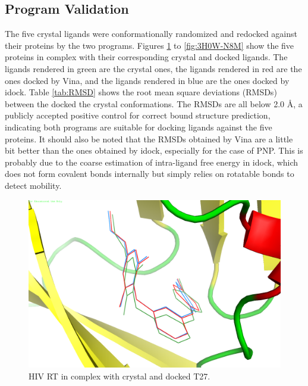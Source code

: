 \subsection{Program Validation}

The five crystal ligands were conformationally randomized and redocked against their proteins by the two programs. Figures \ref{fig:2ZD1-T27} to \ref{fig:3H0W-N8M} show the five proteins in complex with their corresponding crystal and docked ligands. The ligands rendered in green are the crystal ones, the ligands rendered in red are the ones docked by Vina, and the ligands rendered in blue are the ones docked by idock. Table \ref{tab:RMSD} shows the root mean square deviations (RMSDs) between the docked the crystal conformations. The RMSDs are all below 2.0 \AA, a publicly accepted positive control for correct bound structure prediction, indicating both programs are suitable for docking ligands against the five proteins. It should also be noted that the RMSDs obtained by Vina are a little bit better than the ones obtained by idock, especially for the case of PNP. This is probably due to the coarse estimation of intra-ligand free energy in idock, which does not form covalent bonds internally but simply relies on rotatable bonds to detect mobility.

\begin{figure}
\centering
\includegraphics[width=\textwidth]{VirtualScreening/Figures/2ZD1-T27.png}
\caption{HIV RT in complex with crystal and docked T27.}
\label{fig:2ZD1-T27}
\end{figure}

